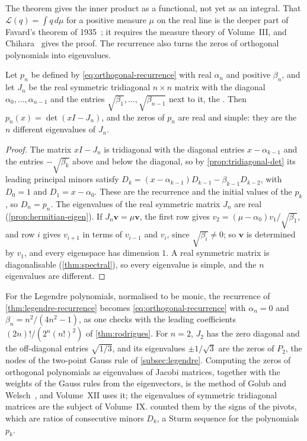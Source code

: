 The theorem gives the inner product as a functional, not yet as an integral. That $\mathcal L(q)=\int q\,d\mu$ for a positive measure $\mu$ on the real line is the deeper part of Favard's theorem of 1935~\cite{favard1935}; it requires the measure theory of Volume~III, and Chihara~\cite[Chaps.~I and~II]{chihara1978} gives the proof. The recurrence also turns the zeros of orthogonal polynomials into eigenvalues.

\begin{proposition}
\label{prop:jacobi-matrix}
Let $p_n$ be defined by \eqref{eq:orthogonal-recurrence} with real $\alpha_n$ and positive $\beta_n$, and let $J_n$ be the real symmetric tridiagonal $n\times n$ matrix with the diagonal $\alpha_0,\ldots,\alpha_{n-1}$ and the entries $\sqrt{\beta_1},\ldots,\sqrt{\beta_{n-1}}$ next to it, the . Then $p_n(x)=\det(xI-J_n)$, and the zeros of $p_n$ are real and simple: they are the $n$ different eigenvalues of $J_n$.
\end{proposition}

\begin{proof}
The matrix $xI-J_n$ is tridiagonal with the diagonal entries $x-\alpha_{k-1}$ and the entries $-\sqrt{\beta_k}$ above and below the diagonal, so by \cref{prop:tridiagonal-det} its leading principal minors satisfy $D_k=(x-\alpha_{k-1})D_{k-1}-\beta_{k-1}D_{k-2}$, with $D_0=1$ and $D_1=x-\alpha_0$. These are the recurrence and the initial values of the $p_k$, so $D_n=p_n$. The eigenvalues of the real symmetric matrix $J_n$ are real (\cref{prop:hermitian-eigen}). If $J_n\mathbf v=\mu\mathbf v$, the first row gives $v_2=(\mu-\alpha_0)v_1/\sqrt{\beta_1}$, and row $i$ gives $v_{i+1}$ in terms of $v_{i-1}$ and $v_i$, since $\sqrt{\beta_i}\ne0$; so $\mathbf v$ is determined by $v_1$, and every eigenspace has dimension $1$. A real symmetric matrix is diagonalisable (\cref{thm:spectral}), so every eigenvalue is simple, and the $n$ eigenvalues are different.
\end{proof}

For the Legendre polynomials, normalised to be monic, the recurrence of \cref{thm:legendre-recurrence} becomes \eqref{eq:orthogonal-recurrence} with $\alpha_n=0$ and $\beta_n=n^2/(4n^2-1)$, as one checks with the leading coefficients $(2n)!/(2^n(n!)^2)$ of \cref{thm:rodrigues}. For $n=2$, $J_2$ has the zero diagonal and the off-diagonal entries $\sqrt{1/3}$, and its eigenvalues $\pm1/\sqrt3$ are the zeros of $P_2$, the nodes of the two-point Gauss rule of \cref{subsec:legendre}. Computing the zeros of orthogonal polynomials as eigenvalues of Jacobi matrices, together with the weights of the Gauss rules from the eigenvectors, is the method of Golub and Welsch~\cite{golubwelsch1969}, and Volume~XII uses it; the eigenvalues of symmetric tridiagonal matrices are the subject of Volume~IX.  counted them by the signs of the pivots, which are ratios of consecutive minors $D_k$, a Sturm sequence for the polynomials $p_k$.

